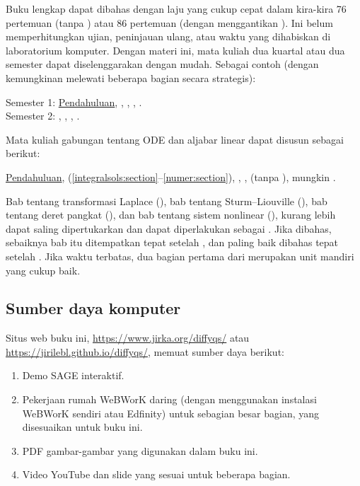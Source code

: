 \medskip

Buku lengkap dapat dibahas dengan laju yang cukup cepat dalam kira-kira 76 pertemuan
(tanpa )
atau 86 pertemuan (dengan  menggantikan
).
Ini belum memperhitungkan ujian, peninjauan ulang,
atau waktu yang dihabiskan di laboratorium komputer. %
Dengan materi ini, mata kuliah dua kuartal atau dua semester dapat diselenggarakan dengan mudah.
Sebagai contoh (dengan kemungkinan melewati beberapa bagian secara strategis):

\medskip

\noindent
Semester 1:
\hyperref[intro:chapter]{Pendahuluan},
,
,
,
.
\\
Semester 2:
,
,
,
.

\medskip

Mata kuliah gabungan tentang ODE dan aljabar linear dapat disusun sebagai berikut:

\medskip

\noindent
\hyperref[intro:chapter]{Pendahuluan},
 (\ref{integralsols:section}--\ref{numer:section}),
,
,
 (tanpa ), mungkin
.

\medskip

Bab tentang
transformasi Laplace (),
bab tentang Sturm--Liouville (),
bab tentang deret pangkat (),
dan bab tentang sistem nonlinear (),
kurang lebih dapat saling dipertukarkan dan dapat diperlakukan sebagai .
Jika  dibahas, sebaiknya bab itu ditempatkan tepat
setelah ,
dan  paling baik dibahas tepat setelah
.
Jika waktu terbatas, dua bagian pertama dari
 merupakan unit mandiri yang cukup baik.

\subsection{Sumber daya komputer}

Situs web buku ini,
\url{https://www.jirka.org/diffyqs/}
atau
\url{https://jirilebl.github.io/diffyqs/},
memuat sumber daya berikut:
\begin{enumerate}
\item Demo SAGE interaktif.
\item Pekerjaan rumah WeBWorK daring
(dengan menggunakan instalasi WeBWorK sendiri atau Edfinity)
untuk sebagian besar bagian, yang disesuaikan untuk buku ini.
\item PDF gambar-gambar yang digunakan dalam buku ini.
\item Video YouTube dan slide yang sesuai untuk beberapa bagian.
\end{enumerate}

